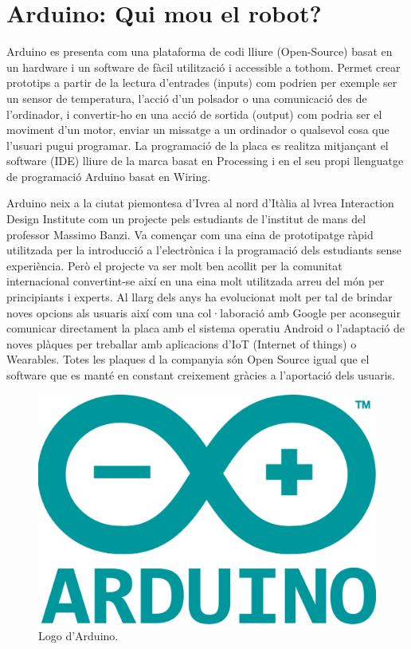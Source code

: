 \section{Arduino: Qui mou el robot?}

Arduino es presenta com una plataforma de codi lliure (Open-Source) basat en un hardware i un software de fàcil utilització i accessible a tothom.  Permet crear prototips a partir de la lectura d’entrades (inputs) com podrien per exemple ser un sensor de temperatura, l’acció d’un polsador o una comunicació des de l’ordinador, i convertir-ho en una acció de sortida (output) com podria ser el moviment d’un motor, enviar un missatge a un ordinador o qualsevol cosa que l’usuari pugui programar. La programació de la placa es realitza mitjançant el software (IDE) lliure de la marca basat en Processing i en el seu propi llenguatge de programació Arduino basat en Wiring. 

Arduino neix a la ciutat piemontesa d’Ivrea al nord d’Itàlia al lvrea Interaction Design Institute com un projecte pels estudiants de l’institut de mans del professor Massimo Banzi. Va començar com una eina de prototipatge ràpid utilitzada per la introducció a l’electrònica i la programació dels estudiants sense experiència. Però el projecte va ser molt ben acollit per la comunitat internacional convertint-se així en una eina molt utilitzada arreu del món per principiants i experts. Al llarg dels anys ha evolucionat molt per tal de brindar noves opcions als usuaris així com una col·laboració amb Google per aconseguir comunicar directament la placa amb el sistema operatiu Android o l’adaptació de noves plàques per treballar amb aplicacions d’IoT (Internet of things) o Wearables. Totes les plaques d la companyia són Open Source igual que el software que es manté en constant creixement gràcies a l’aportació dels usuaris. 

\begin{figure}[H]
	\centering
	\includegraphics[scale=0.1]{arduino-logo.png}
	\caption{Logo d'Arduino.}
	\label{fig:arduinologo}
\end{figure}

